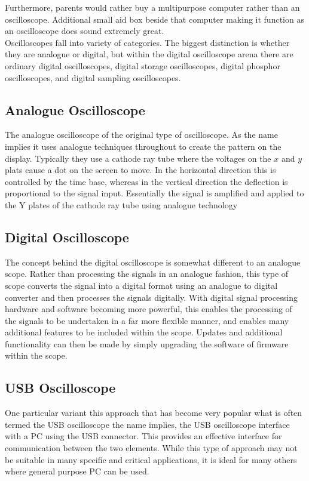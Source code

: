 \documentclass[12pt,a4paper]{article}
\begin{document}
Furthermore, parents would rather buy a multipurpose computer rather than an oscilloscope. Additional small aid box beside that computer making it function as an oscilloscope does sound extremely great. \\

Oscilloscopes fall into variety of categories. The biggest distinction is whether they are analogue or digital, but within the digital oscilloscope arena there are ordinary digital oscilloscopes, digital storage oscilloscopes, digital phosphor oscilloscopes, and digital sampling oscilloscopes.

\subsection{Analogue Oscilloscope}
	The analogue oscilloscope of the original type of oscilloscope. As the name implies it uses analogue techniques throughout to create the pattern on the display. Typically they use a cathode ray tube where the voltages on the $x$ and $y$ plats cause a dot on the screen to move. In the horizontal direction this is controlled by the time base, whereas in the vertical direction the deflection is proportional to the signal input. Essentially the signal is amplified and applied to the Y plates of the cathode ray tube using analogue technology

\subsection{Digital Oscilloscope}
	The concept behind the digital oscilloscope is somewhat different to an analogue scope. Rather than processing the signals in an analogue fashion, this type of scope converts the signal into a digital format using an analogue to digital converter and then processes the signals digitally. With digital signal processing hardware and software becoming more powerful, this enables the processing of the signals to be undertaken in a far more flexible manner, and enables many additional features to be included within the scope. Updates and additional functionality can then be made by simply upgrading the software of firmware within the scope.
	
\subsection{USB Oscilloscope} 
	One particular variant this approach that has become very popular what is often termed the USB oscilloscope the name implies, the USB oscilloscope interface with a PC using the USB connector. This provides an effective interface for communication between the two elements. While this type of approach may not be suitable in many specific and critical applications, it is ideal for many others where general purpose PC can be used. 
\end{document}
